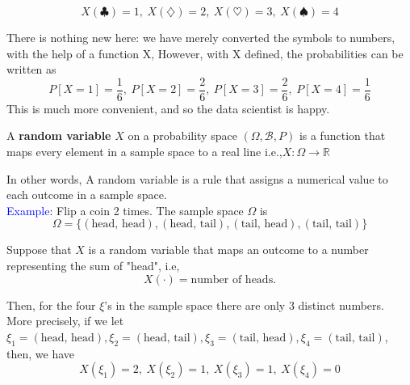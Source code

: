 \documentclass[letterpaper, 10.5pt,landscape]{article}
\begin{document}
\begin{multicols*}{3}
\[X(\clubsuit) = 1, \hspace{3pt} X(\diamondsuit) = 2, \hspace{3pt}  X(\heartsuit) = 3, \hspace{3pt}
X(\spadesuit) = 4\]  



There is nothing new here: we have merely converted the symbols to numbers, with the help of a function X, However, with X defined, the probabilities can be written as
\vspace{-3pt}
\[P[X=1] = \frac{1}{6}, \hspace{3pt} P[X=2] = \frac{2}{6}, \hspace{3pt} P[X=3] = \frac{2}{6}, \hspace{3pt} P[X=4] = \frac{1}{6}\]
\vspace{-3pt}
This is much more convenient, and so the data scientist is happy.


\vspace{7pt}

A \textbf{random variable} $X$ on a probability space \( \left( \Omega, \mathcal{B}, P \right)\) is a function that maps every element in a sample space to a real line i.e.,\(\boxed{X: \Omega \rightarrow \mathbb{R}} \)

\vspace{2pt}

In other words, A random variable is a rule that assigns a numerical value to each outcome in a sample space. \\


\vspace{5pt}
\textcolor{blue}{Example}: Flip a coin 2 times. The sample space $\Omega$ is 
\vspace{-3pt}
\[\Omega = \{(\text{head, head}), (\text{head, tail}), (\text{tail, head}), (\text{tail, tail})\}\]

Suppose that $X$ is a random variable that maps an outcome to a number representing the sum of "head", i.e,
\[X(\cdot) = \text{number of heads}.\]

Then, for the four $\xi$'s in the sample space there are only 3 distinct numbers. More precisely, if we let $\xi_{1} = (\text{head, head}), \xi_{2} = (\text{head, tail}), \xi_{3} = (\text{tail, head}), \xi_{4} = (\text{tail, tail})$, then, we have
\vspace{-2pt}
\[X(\xi_{1}) = 2, \hspace{3pt} X(\xi_{2}) = 1, \hspace{3pt} X(\xi_{3}) = 1, \hspace{3pt} X(\xi_{4}) = 0\]


\end{multicols*}
\end{document}

